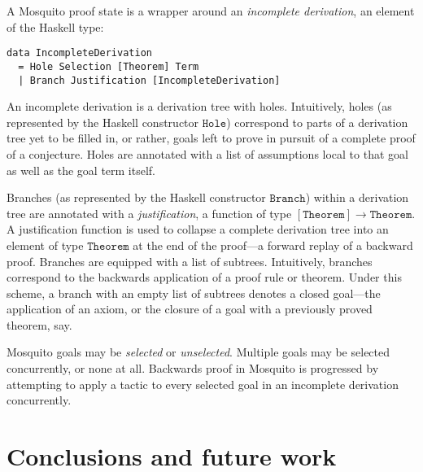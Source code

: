 \documentclass{llncs}
\begin{document}
A Mosquito proof state is a wrapper around an \emph{incomplete derivation}, an element of the Haskell type:
\begin{lstlisting}
data IncompleteDerivation
  = Hole Selection [Theorem] Term
  | Branch Justification [IncompleteDerivation]
\end{lstlisting}
An incomplete derivation is a derivation tree with holes.
Intuitively, holes (as represented by the Haskell constructor $\mathtt{Hole}$) correspond to parts of a derivation tree yet to be filled in, or rather, goals left to prove in pursuit of a complete proof of a conjecture.
Holes are annotated with a list of assumptions local to that goal as well as the goal term itself.

Branches (as represented by the Haskell constructor $\mathtt{Branch}$) within a derivation tree are annotated with a \emph{justification}, a function of type $\mathtt{[Theorem]} \rightarrow \mathtt{Theorem}$.
A justification function is used to collapse a complete derivation tree into an element of type $\mathtt{Theorem}$ at the end of the proof---a forward replay of a backward proof.
Branches are equipped with a list of subtrees.
Intuitively, branches correspond to the backwards application of a proof rule or theorem.
Under this scheme, a branch with an empty list of subtrees denotes a closed goal---the application of an axiom, or the closure of a goal with a previously proved theorem, say.

Mosquito goals may be \emph{selected} or \emph{unselected}.
Multiple goals may be selected concurrently, or none at all.
Backwards proof in Mosquito is progressed by attempting to apply a tactic to every selected goal in an incomplete derivation concurrently.

\section{Conclusions and future work}
\label{sect.conclusions}


\end{document}
